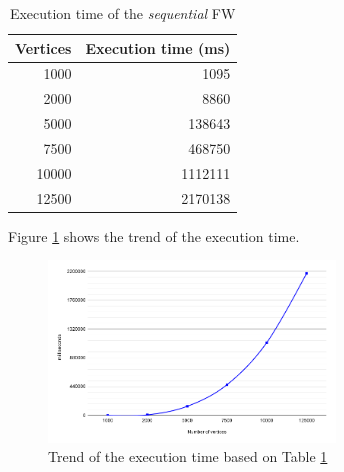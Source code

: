 \documentclass[compsoc]{IEEEtran}
\begin{document}
\begin{table}[h!]
\centering
\begin{tabular}{|r|r|}
\hline
\rowcolor[HTML]{3166FF} 
{\color[HTML]{FFFFFF} \textbf{Vertices}} & {\color[HTML]{FFFFFF} \textbf{Execution time (ms)}} \\ \hline
1000                                     & 1095                                                \\ \hline
2000                                     & 8860                                                \\ \hline
5000                                     & 138643                                              \\ \hline
7500                                     & 468750                                              \\ \hline
10000                                    & 1112111                                             \\ \hline
12500                                    & 2170138                                             \\ \hline
\end{tabular}
\caption{Execution time of the \emph{sequential} FW}                                                                                                                                            
\label{tab:seq-time} 
\end{table}

Figure \ref{fig:seq-time} shows the trend of the execution time. 

\begin{figure}[h!]
\centering                                                                        
\includegraphics[width=3in]{images/seq-time}
\captionsetup{justification=centering,margin=2cm}                                                                                                                                   
\caption{Trend of the execution time based on Table \ref{tab:seq-time}}                                                                                                                                            
\label{fig:seq-time}                                                                                                                                                           
\end{figure}
\end{document}

